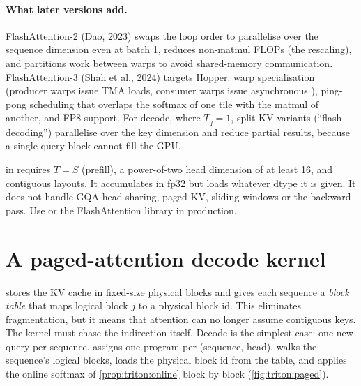 \paragraph{What later versions add.} FlashAttention-2 (Dao, 2023) swaps the loop order to
parallelise over the sequence dimension even at batch 1, reduces non-matmul FLOPs (the
rescaling), and partitions work between warps to avoid shared-memory communication.
FlashAttention-3 (Shah et al., 2024) targets Hopper: warp specialisation (producer warps
issue TMA loads, consumer warps issue asynchronous ), ping-pong scheduling
that overlaps the softmax of one tile with the matmul of another, and FP8 support. For
decode, where $T_q=1$, split-KV variants (``flash-decoding'') parallelise over the key
dimension and reduce partial results, because a single query block cannot fill the GPU.

\begin{pitfall}
 in  requires $T=S$ (prefill), a power-of-two head
dimension of at least 16, and contiguous  layouts. It
accumulates in fp32 but loads whatever dtype it is given. It does not handle GQA head
sharing, paged KV, sliding windows or the backward pass. Use
 or the FlashAttention library in production.
\end{pitfall}

\section{A paged-attention decode kernel}\label{sec:triton:paged}
 stores the KV cache in fixed-size physical blocks and gives each
sequence a \emph{block table} that maps logical block $j$ to a physical block id. This
eliminates fragmentation, but it means that attention can no longer assume contiguous
keys. The kernel must chase the indirection itself. Decode is the simplest case: one
new query per sequence.  assigns one program per (sequence,
head), walks the sequence's logical blocks, loads the physical block id from the table,
and applies the online softmax of \cref{prop:triton:online} block by block
(\cref{fig:triton:paged}).

